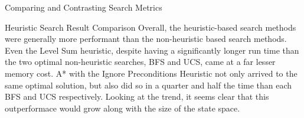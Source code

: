 \documentclass{article}
\begin{document}
\begin{section}{Comparing and Contrasting Search Metrics}
\begin{subsection}{Heuristic Search Result Comparison}
	Overall, the heuristic-based search methods were generally more performant than the non-heuristic based search methods. Even the Level Sum heuristic,
	despite having a significantly longer run time than the two optimal non-heuristic searches, BFS and UCS, came at a far lesser memory cost. A* with the
	Ignore Preconditions Heuristic not only arrived to the same optimal solution, but also did so in a quarter and half the time than each BFS and UCS 
	respectively. Looking at the trend, it seems clear that this outperformace would grow along with the size of the state space. 
\end{subsection}
\end{section}
\end{document}
